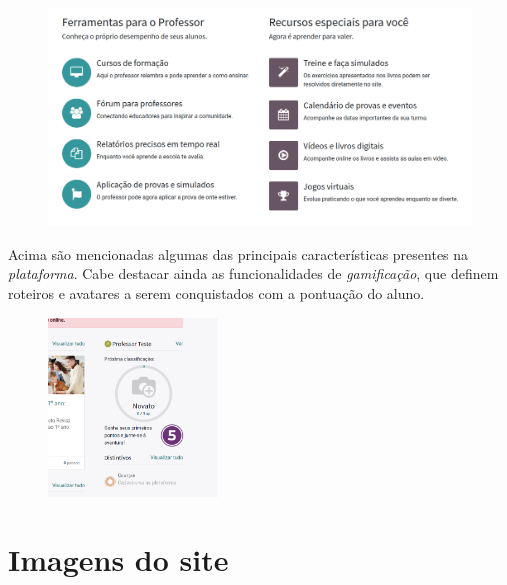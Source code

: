 \begin{figure}[h]
\includegraphics[width=\textwidth]{imgs/sobre}
\end{figure}

Acima são mencionadas algumas das principais características presentes na \textit{plataforma}.
Cabe destacar ainda as funcionalidades de \textit{gamificação}, que
definem roteiros e avatares a serem conquistados com a 
pontuação do aluno. 

\begin{figure}[b]
\centering \includegraphics[width=0.4\textwidth]{imgs/game}
\end{figure}




\chapter{Imagens do site}

\mbox{}

